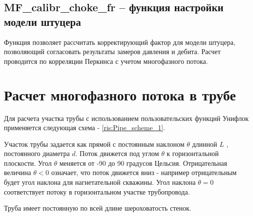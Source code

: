 

\subsection{MF\_calibr\_choke\_fr – функция настройки модели штуцера}
Функция позволяет рассчитать корректирующий фактор для модели штуцера, позволяющий согласовать результаты замеров давления и дебита. Расчет проводится по корреляции Перкинса \cite{Perkins_1993} с учетом многофазного потока.  


\newpage
\section{Расчет многофазного потока в трубе}

Для расчета участка трубы с использованием пользовательских функций Унифлок применяется следующая схема - \ref{ris:Pipe_scheme_1}.

Участок трубы задается как прямой с постоянным наклоном $\theta$  длинной $L$ , постоянного диаметра $d$. Поток движется под углом $\theta$ к горизонтальной плоскости. Угол  $\theta$ меняется от -90 до 90 градусов Цельсия. Отрицательная величина  $\theta < 0 $ означает, что поток движется вниз - например отрицательным будет угол наклона для нагнетательной скважины. Угол наклона $\theta = 0 $ соответствует потоку в горизонтальном участке трубопровода.

Труба имеет постоянную по всей длине шероховатость стенок. 




